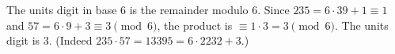 The units digit in base $6$ is the remainder modulo $6$. Since $235=6\cdot39+1\equiv1$ and $57=6\cdot9+3\equiv3\pmod6$, the product is $\equiv1\cdot3=3\pmod6$. The units digit is $\boxed{3}$. (Indeed $235\cdot57=13395=6\cdot2232+3$.)

